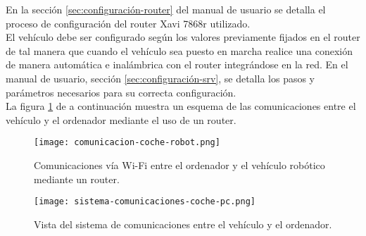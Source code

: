 En la sección \ref{sec:configuración-router} del manual de usuario se detalla el proceso de configuración del router Xavi 7868r utilizado.\\

El vehículo debe ser configurado según los valores previamente fijados en el router de tal manera que cuando el vehículo sea puesto en marcha realice una conexión de manera automática e inalámbrica con el router integrándose en la red. En el manual de usuario, sección \ref{sec:configuración-srv}, se detalla los pasos y parámetros necesarios para su correcta configuración.\\


La figura \ref{fig:com-coche-pc} de a continuación muestra un esquema de las comunicaciones entre el vehículo y el ordenador mediante el uso de un router.\\

\begin{figure}[H]
  \begin{center}
    \texttt{[image: comunicacion-coche-robot.png]}
  \end{center}
  \caption{Comunicaciones vía Wi-Fi entre el ordenador y el vehículo robótico mediante un router.}
  \label{fig:com-coche-pc}
\end{figure}


\begin{figure}[H]
  \begin{center}
    \texttt{[image: sistema-comunicaciones-coche-pc.png]}
  \end{center}
  \caption{Vista del sistema de comunicaciones entre el vehículo y el ordenador.}
  \label{fig:conjunto-video}
\end{figure}


